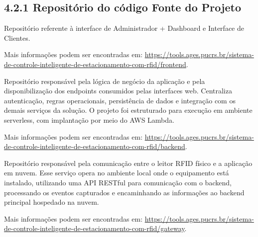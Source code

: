 \hypertarget{__RefHeading___Toc4803_3118176633}{}
\subsection*{4.2.1 Repositório do código Fonte do Projeto}
\label{ages-iii:text-h-0077}

\indent Repositório referente à interface de Administrador + Dashboard e Interface de Clientes.\par

Mais informações podem ser encontradas em: \url{https://tools.ages.pucrs.br/sistema-de-controle-inteligente-de-estacionamento-com-rfid/frontend}.\par

\indent Repositório responsável pela lógica de negócio da aplicação e pela disponibilização dos endpoints consumidos pelas interfaces web. Centraliza autenticação, regras operacionais, persistência de dados e integração com os demais serviços da solução. O projeto foi estruturado para execução em ambiente serverless, com implantação por meio do AWS Lambda\space\cite{ages-iii-aws-lambda}.\par

Mais informações podem ser encontradas em: \url{https://tools.ages.pucrs.br/sistema-de-controle-inteligente-de-estacionamento-com-rfid/backend}.\par

\indent Repositório responsável pela comunicação entre o leitor RFID físico e a aplicação em nuvem. Esse serviço opera no ambiente local onde o equipamento está instalado, utilizando uma API RESTful\space\cite{ages-iii-fielding-rest} para comunicação com o backend, processando os eventos capturados e encaminhando as informações ao backend principal hospedado na nuvem.\par

Mais informações podem ser encontradas em: \url{https://tools.ages.pucrs.br/sistema-de-controle-inteligente-de-estacionamento-com-rfid/gateway}.\par
